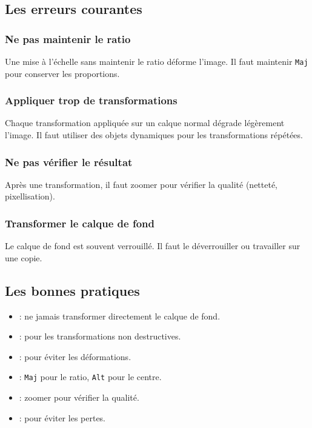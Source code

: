 \subsection{Les erreurs courantes}

\subsubsection{Ne pas maintenir le ratio}

Une mise à l'échelle sans maintenir le ratio déforme l'image. Il faut maintenir \texttt{Maj} pour conserver les proportions.

\subsubsection{Appliquer trop de transformations}

Chaque transformation appliquée sur un calque normal dégrade légèrement l'image. Il faut utiliser des objets dynamiques pour les transformations répétées.

\subsubsection{Ne pas vérifier le résultat}

Après une transformation, il faut zoomer pour vérifier la qualité (netteté, pixellisation).

\subsubsection{Transformer le calque de fond}

Le calque de fond est souvent verrouillé. Il faut le déverrouiller ou travailler sur une copie.

\subsection{Les bonnes pratiques}

\begin{itemize}
    \item {} : ne jamais transformer directement le calque de fond.
    \item {} : pour les transformations non destructives.
    \item {} : pour éviter les déformations.
    \item {} : \texttt{Maj} pour le ratio, \texttt{Alt} pour le centre.
    \item {} : zoomer pour vérifier la qualité.
    \item {} : pour éviter les pertes.
\end{itemize}

